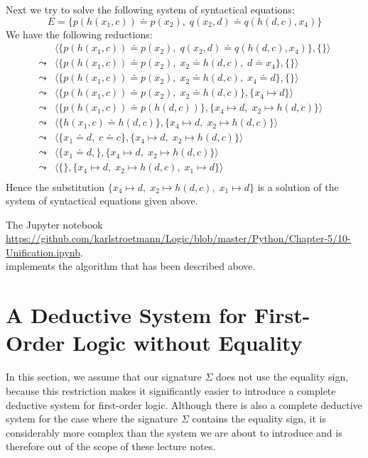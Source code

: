 \exampleEng
Next we try to solve the following system of syntactical equations: 
\[ E = \big\{ p(h(x_1,c)) \doteq p(x_2),\; q(x_2, d) \doteq q(h(d,c),x_4) \big\} \]
We have the following reductions:
$$
\begin{array}{ll}
          & \big\langle \big\{ p(h(x_1,c)) \doteq p(x_2),\; q(x_2, d) \doteq q(h(d,c),x_4) \big\}, \{ \} \big\rangle \\[0.2cm]
 \leadsto & \big\langle \big\{ p(h(x_1,c)) \doteq p(x_2),\; x_2 \doteq h(d,c), \; d \doteq x_4 \big\}, \{ \} \big\rangle \\[0.2cm]
 \leadsto & \big\langle \big\{ p(h(x_1,c)) \doteq p(x_2),\; x_2 \doteq h(d,c), \; x_4 \doteq d \big\}, \{ \} \big\rangle \\[0.2cm]
 \leadsto & \big\langle \big\{ p(h(x_1,c)) \doteq p(x_2),\; x_2 \doteq h(d,c) \big\}, \{ x_4 \mapsto d \} \big\rangle \\[0.2cm]
 \leadsto & \big\langle \big\{ p(h(x_1,c)) \doteq p(h(d,c)) \big\}, \{ x_4 \mapsto d,\; x_2 \mapsto h(d,c) \} \big\rangle \\[0.2cm]
 \leadsto & \big\langle \big\{ h(x_1,c) \doteq h(d,c) \big\}, \{ x_4 \mapsto d,\; x_2 \mapsto h(d,c) \} \big\rangle \\[0.2cm]
 \leadsto & \big\langle \big\{ x_1 \doteq d,\; c \doteq c \big\}, \{ x_4 \mapsto d,\; x_2 \mapsto h(d,c) \} \big\rangle \\[0.2cm]
 \leadsto & \big\langle \big\{ x_1 \doteq d,\big\}, \{ x_4 \mapsto d,\; x_2 \mapsto h(d,c) \} \big\rangle \\[0.2cm]
 \leadsto & \big\langle \big\{\big\}, \{ x_4 \mapsto d,\; x_2 \mapsto h(d,c),\; x_1 \mapsto d \} \big\rangle \\[0.2cm]
\end{array}
$$
Hence the  substitution  $\{ x_4 \mapsto d,\; x_2 \mapsto h(d,c),\; x_1 \mapsto d \}$ is a solution
of the system of syntactical equations given above.
\eox


\noindent
The Jupyter notebook
\\[0.2cm]
\hspace*{0.0cm}
\href{https://github.com/karlstroetmann/Logic/blob/master/Python/Chapter-5/10-Unification.ipynb}{https://github.com/karlstroetmann/Logic/blob/master/Python/Chapter-5/10-Unification.ipynb}.
\\[0.2cm]
implements the algorithm that has been described above.

\section{A Deductive System for First-Order Logic without Equality \label{sec:fol-calculus}}
In this section, we assume that our signature $\Sigma$ does not use the equality sign, because this restriction
makes it significantly easier to introduce a complete deductive system for first-order logic. Although there is
also a complete deductive system for the case where the signature $\Sigma$ contains the equality sign, it is
considerably more complex than the system we are about to introduce and is therefore out of the scope of these
lecture notes. 

